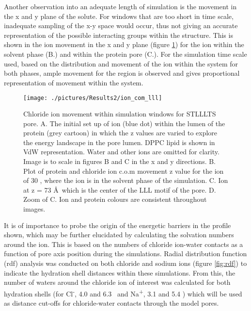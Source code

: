 Another observation into an adequate length of simulation is the movement in the x and y plane of the solute. For windows that are too short in time scale, inadequate sampling of the x-y space would occur, thus not giving an accurate representation of the possible interacting groups within the structure. This is shown in the ion movement in the x and y plane  (figure \ref{fig:ion_com_lll}) for the ion within the solvent phase (B.) and within the protein pore (C.). For the simulation time scale used, based on the distribution and movement of the ion within the system for both phases, ample movement for the region is observed and gives proportional representation of movement within the system. 

\begin{figure}[H]
\begin{center}
\texttt{[image: ./pictures/Results2/ion\_com\_lll]}
\caption[Chloride ion movement within simulation windows for STLLLTS pore.] {Chloride ion movement within simulation windows for STLLLTS pore. A. The initial set up of ion (blue dot) within the lumen of the protein (grey cartoon) in which the z values are varied to explore the energy landscape in the pore lumen. DPPC lipid is shown in VdW representation. Water and other ions are omitted for clarity. Image is to scale in figures B and C in the x and y directions. B. Plot of protein and chloride ion c.o.m movement z value for the ion of 30 \angstrom,  where the ion is in the solvent phase of the simulation. C. Ion at z = 73 \AA\, which is the center of the LLL motif of the pore. D. Zoom of C. Ion and protein colours are consistent throughout images.} %
\label{fig:ion_com_lll}
\end{center}
\end{figure}

It is of importance to probe the origin of the energetic barriers in the profile shown, which may be further elucidated by calculating the solvation numbers around the ion. This is based  on the numbers of chloride ion-water contacts as a function of pore axis position during the simulations. Radial distribution function (rdf) analysis was conducted on both chloride and sodium ions (figure \ref{fig:rdf}) to indicate the hydration shell distances within these simulations. From this, the number of waters around the chloride ion of interest was calculated for both hydration shells (for Cl\textsuperscript{-}, 4.0 and 6.3 \angstrom\ and Na\textsuperscript{+}, 3.1 and 5.4 \angstrom) which will be used as distance cut-offs for chloride-water contacts through the model pores.

